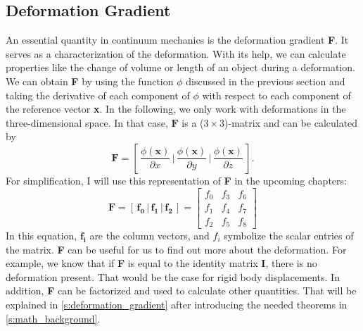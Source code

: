 \subsection{Deformation Gradient}
\label{ss:deformation_gradient}
An essential quantity in continuum mechanics is the deformation gradient \textbf{F}. It serves as a characterization of the deformation. With its help, we can calculate properties like the change of volume or length of an object during a deformation. We can obtain \textbf{F} by using the function $\phi$ discussed in the previous section and taking the derivative of each component of $\phi$ with respect to each component of the reference vector \textbf{x}. In the following, we only work with deformations in the three-dimensional space. In that case, $\mathbf{F}$ is a ($3 \times 3$)-matrix and can be calculated by
\begin{equation}\label{eq:deformation_gradient_general}
\mathbf{F} = \left[ \,\frac{\phi(\mathbf{x})}{\partial x}\, \bigg| \,\frac{\phi(\mathbf{x})}{\partial y}\, \bigg| \,\frac{\phi(\mathbf{x})}{\partial z}\, \right].
\end{equation}
For simplification, I will use this representation of \textbf{F} in the upcoming chapters:
\begin{equation}  \label{eq:deformation_gradient}
\textbf{F} = \left[ \,\mathbf{f_0}\, \bigg| \,\mathbf{f_1}\, \bigg| \,\mathbf{f_2}\, \right] = \begin{bmatrix} f_0 & f_3 & f_6 \\ f_1 & f_4 & f_7 \\ f_2 & f_5 & f_8 \end{bmatrix} 
\end{equation}
In this equation, $\mathbf{f_i}$ are the column vectors, and $f_i$ symbolize the scalar entries of the matrix. \textbf{F} can be useful for us to find out more about the deformation. For example, we know that if \textbf{F} is equal to the identity matrix \textbf{I}, there is no deformation present. That would be the case for rigid body displacements. In addition, \textbf{F} can be factorized and used to calculate other quantities. That will be explained in \autoref{s:deformation_gradient} after introducing the needed theorems in \autoref{s:math_background}.


